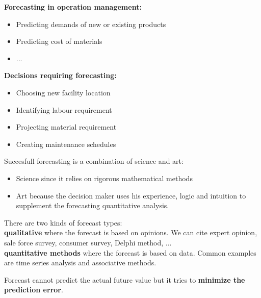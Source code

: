 \documentclass{beamer}
\begin{document}
\begin{frame}{}
\begin{example}
\textbf{Forecasting in operation management:}
\begin{itemize}
	\item Predicting demands of new or existing products
	\item Predicting cost of materials
	\item ...
\end{itemize}
\vspace{5mm}
\textbf{Decisions requiring forecasting:}
\begin{itemize}
		\item Choosing new facility location
		\item Identifying labour requirement
		\item Projecting material requirement
		\item Creating maintenance schedules
\end{itemize}
\end{example}
\end{frame}

\begin{frame}{}
Succesfull forecasting is a combination of science and art:
\begin{itemize}
	\item Science since it relies on rigorous mathematical methods
	\item Art because the decision maker uses his experience, logic and intuition to supplement the forecasting quantitative analysis.
\end{itemize}
\end{frame}

\begin{frame}{}
There are two kinds of forecast types:\\
\vspace{5mm} 
\textbf{qualitative} where the forecast is based on opinions. We can cite expert opinion, sale force survey, consumer survey, Delphi method, ...\\
\vspace{5mm} 
\textbf{quantitative methods} where the forecast is based on data. Common examples are time series analysis and associative methods.\\
\vspace{10mm}

\begin{center}
\end{center}
\begin{block}{}
Forecast cannot predict the actual future value but it tries to \textbf{minimize the prediction error}.
\end{block}
\end{frame}
\end{document}
